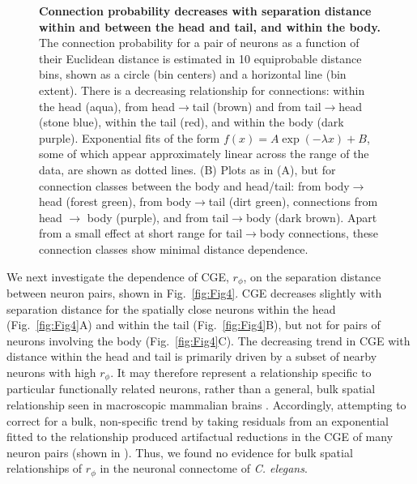 \documentclass[10pt,letterpaper]{article}
\begin{document}
\begin{figure}[h]
  \centering
  \caption{
\textbf{Connection probability decreases with separation distance within and between the head and tail, and within the body.}
The connection probability for a pair of neurons as a function of their Euclidean distance is estimated in 10 equiprobable distance bins, shown as a circle (bin centers) and a horizontal line (bin extent).
There is a decreasing relationship for connections: within the head (aqua), from head$\rightarrow$tail (brown) and from tail$\rightarrow$head (stone blue), within the tail (red), and within the body (dark purple).
Exponential fits of the form $f(x) = A\exp(-\lambda x) + B$, some of which appear approximately linear across the range of the data, are shown as dotted lines.
(B)
Plots as in (A), but for connection classes between the body and head/tail: from body$\rightarrow$head (forest green), from body$\rightarrow$tail (dirt green), connections from head $\rightarrow$ body (purple), and from tail$\rightarrow$body (dark brown).
Apart from a small effect at short range for tail$\rightarrow$body connections, these connection classes show minimal distance dependence.
  }
  \label{fig:Fig3}
\end{figure}


We next investigate the dependence of CGE, $r_\phi$, on the separation distance between neuron pairs, shown in Fig.~\ref{fig:Fig4}.
CGE decreases slightly with separation distance for the spatially close neurons within the head (Fig.~\ref{fig:Fig4}A) and within the tail (Fig.~\ref{fig:Fig4}B), but not for pairs of neurons involving the body (Fig.~\ref{fig:Fig4}C).
The decreasing trend in CGE with distance within the head and tail is primarily driven by a subset of nearby neurons with high $r_\phi$.
It may therefore represent a relationship specific to particular functionally related neurons, rather than a general, bulk spatial relationship seen in macroscopic mammalian brains \cite{Fulcher:2016ck}.
Accordingly, attempting to correct for a bulk, non-specific trend by taking residuals from an exponential fitted to the relationship produced artifactual reductions in the CGE of many neuron pairs (shown in ).
Thus, we found no evidence for bulk spatial relationships of $r_\phi$ in the neuronal connectome of \emph{C. elegans}.
\end{document}
